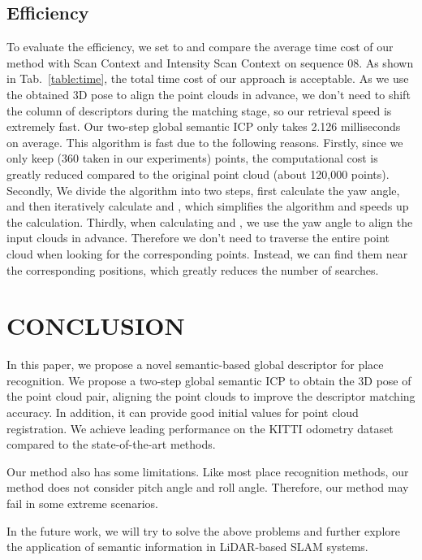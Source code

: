 \documentclass[letterpaper, 10 pt, conference]{ieeeconf}
\begin{document}
\subsection{Efficiency}
To evaluate the efficiency, we set  to  and compare the average time cost of our method with Scan Context and Intensity Scan Context on sequence 08. As shown in Tab.~\ref{table:time}, the total time cost of our approach is acceptable. As we use the obtained 3D pose to align the point clouds in advance, we don't need to shift the column of descriptors during the matching stage, so our retrieval speed is extremely fast. Our two-step global semantic ICP only takes 2.126 milliseconds on average. This algorithm is fast due to the following reasons. Firstly, since we only keep  (360 taken in our experiments) points, the computational cost is greatly reduced compared to the original point cloud (about 120,000 points). Secondly, We divide the algorithm into two steps, first calculate the yaw angle, and then iteratively calculate  and , which simplifies the algorithm and speeds up the calculation. Thirdly, when calculating  and , we use the yaw angle to align the input clouds in advance. Therefore we don’t need to traverse the entire point cloud when looking for the corresponding points. Instead, we can find them near the corresponding positions, which greatly reduces the number of searches.


\section{CONCLUSION}
In this paper, we propose a novel semantic-based global descriptor for place recognition. We propose a two-step global semantic ICP to obtain the 3D pose  of the point cloud pair, aligning the point clouds to improve the descriptor matching accuracy. In addition, it can provide good initial values for point cloud registration. We achieve leading performance on the KITTI odometry dataset compared to the state-of-the-art methods. 

Our method also has some limitations. Like most place recognition methods, our method does not consider pitch angle and roll angle. Therefore, our method may fail in some extreme scenarios.

In the future work, we will try to solve the above problems and further explore the application of semantic information in LiDAR-based SLAM systems.









\end{document}
